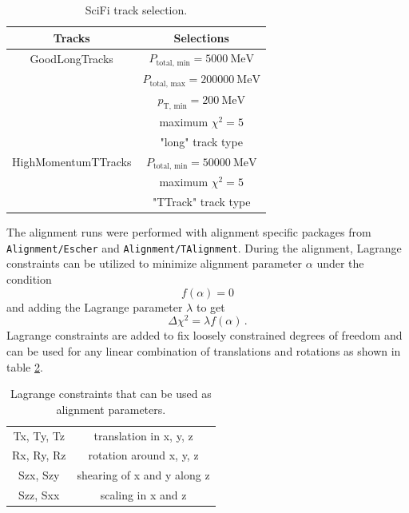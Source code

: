 \begin{table}[!ht]
    \centering
    \begin{tabular}{c|c}
        \toprule
            Tracks & Selections \\
        \midrule
            GoodLongTracks &  $P_{\text{total, min}} = \SI{5000}{\mega\electronvolt}$ \\
            & $P_{\text{total, max}} = \SI{200000}{\mega\electronvolt}$ \\
            & $p_\text{T, min} = \SI{200}{\mega\electronvolt}$ \\
            & maximum $\chi^2 = 5$ \\
            & "long" track type \\
            \hline
            HighMomentumTTracks & $P_{\text{total, min}} = \SI{50000}{\mega\electronvolt}$ \\
            & maximum $\chi^2 = 5$ \\
            & "TTrack" track type \\
        \bottomrule
    \end{tabular}
    \caption{SciFi track selection.}
    \label{tab:tracks}
\end{table}

The alignment runs were performed with alignment specific packages from \\ \verb|Alignment/Escher| and \verb|Alignment/TAlignment|\cite{align}.
During the alignment, Lagrange constraints can be utilized to minimize alignment
parameter $\alpha $ under the condition
\begin{equation}
  f(\alpha) = 0
\end{equation}
and adding the Lagrange parameter $\lambda$ to get
\begin{equation}
  \Delta \chi^2 = \lambda f(\alpha)\,.
\end{equation}
Lagrange constraints are added to fix loosely constrained degrees of freedom and can be used for any linear combination of translations and rotations as shown in table \ref{tab:lagr}.

\begin{table}[!ht]
    \centering
    \begin{tabular}{c|c}
        \toprule
            Tx, Ty, Tz & translation in x, y, z \\
            Rx, Ry, Rz & rotation around x, y, z \\
            Szx, Szy & shearing of x and y along z \\
            Szz, Sxx & scaling in x and z \\
        \bottomrule
    \end{tabular}
    \caption{Lagrange constraints that can be used as alignment parameters.}
    \label{tab:lagr}
\end{table}

